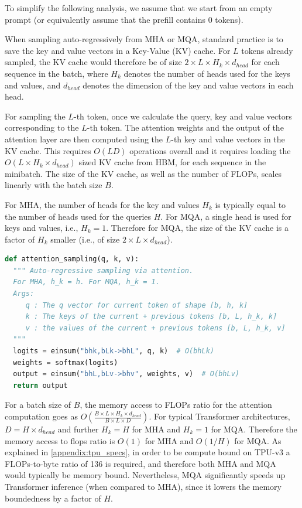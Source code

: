 \documentclass[11pt, a4paper, logo, onecolumn]{googledeepmind}
\theoremstyle{definition}
\begin{document}
To simplify the following analysis, we assume that we start from an empty prompt (or equivalently assume that the  prefill contains 0 tokens).

When sampling auto-regressively from MHA or MQA, standard practice is to save the key and value vectors in a Key-Value (KV) cache. For $L$ tokens already sampled, the KV cache would therefore be of size $2 \times L \times H_k \times d_{head}$ for each sequence in the batch, where $H_k$ denotes the number of heads used for the keys and values, and $d_{head}$ denotes the dimension of the key and value vectors in each head.

For sampling the $L$-th token, once we calculate the query, key and value vectors corresponding to the $L$-th token. The attention weights and the output of the attention layer are then computed using the $L$-th key and value vectors in the KV cache. This requires $O(LD)$ operations overall and it requires loading the $O(L \times H_k \times d_{head})$ sized KV cache from HBM, for each sequence in the minibatch. The size of the KV cache, as well as the number of FLOPs, scales linearly with the batch size $B$.

For MHA, the number of heads for the key and values $H_k$ is typically equal to the number of heads used for the queries $H$. For MQA, a single head is used for keys and values, i.e., $H_k = 1$. Therefore for MQA, the size of the KV cache is a factor of $H_k$ smaller (i.e., of size $2 \times L \times d_{head}$). %

\begin{lstlisting}[language=Python]
def attention_sampling(q, k, v):
  """ Auto-regressive sampling via attention.
  For MHA, h_k = h. For MQA, h_k = 1.
  Args:
     q : The q vector for current token of shape [b, h, k]
     k : The keys of the current + previous tokens [b, L, h_k, k]
     v : the values of the current + previous tokens [b, L, h_k, v]
  """
  logits = einsum("bhk,bLk->bhL", q, k)  # O(bhLk)
  weights = softmax(logits)
  output = einsum("bhL,bLv->bhv", weights, v)  # O(bhLv)
  return output
\end{lstlisting}

For a batch size of $B$, the memory access to FLOPs ratio for the attention computation goes as $O(\frac{B \times L \times H_k \times d_{head}}{B \times L \times D})$. For typical Transformer architectures, $D =H \times d_{head}$ and further $H_k=H$ for MHA and $H_k=1$ for MQA.  Therefore the memory access to flops ratio is $O(1)$ for MHA and $O(1/H)$ for MQA. As explained in \ref{appendix:tpu_specs}, in order to be compute bound on TPU-v3 a FLOPs-to-byte ratio of 136 is required, and therefore both MHA and MQA would typically be memory bound. Nevertheless, MQA significantly speeds up Transformer inference (when compared to MHA), since it lowers the memory boundedness by a factor of $H$.
\end{document}
